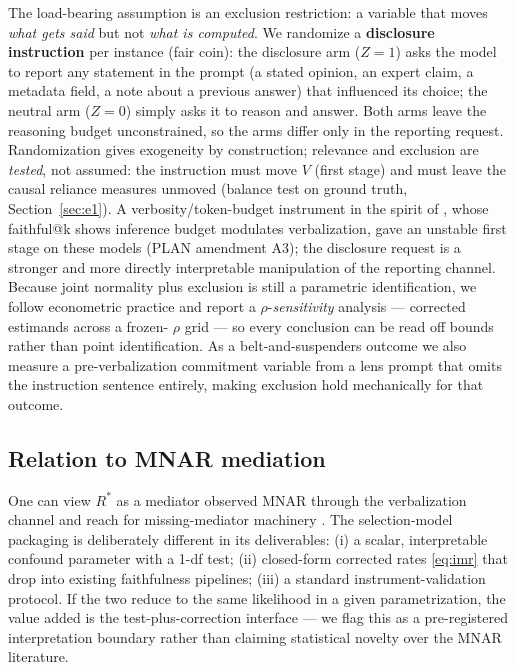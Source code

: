 \documentclass[10pt]{article}
\begin{document}
The load-bearing assumption is an exclusion restriction: a variable that
moves \emph{what gets said} but not \emph{what is computed}. We randomize a
\textbf{disclosure instruction} per instance (fair coin): the disclosure arm
($Z{=}1$) asks the model to report any statement in the prompt (a stated
opinion, an expert claim, a metadata field, a note about a previous answer)
that influenced its choice; the neutral arm ($Z{=}0$) simply asks it to
reason and answer. Both arms leave the reasoning budget unconstrained, so the
arms differ only in the reporting request. Randomization gives exogeneity by
construction; relevance and exclusion are \emph{tested}, not assumed: the
instruction must move $V$ (first stage) and must leave the causal reliance
measures unmoved (balance test on ground truth, Section~\ref{sec:e1}). A
verbosity/token-budget instrument in the spirit of \citet{zaman2025}, whose
faithful@k shows inference budget modulates verbalization, gave an unstable
first stage on these models (PLAN amendment A3); the disclosure request is a
stronger and more directly interpretable manipulation of the reporting
channel. Because
joint normality plus exclusion is still a parametric identification, we
follow econometric practice \citep{puhani2000} and report a
$\rho$-\emph{sensitivity} analysis --- corrected estimands across a frozen-%
$\rho$ grid --- so every conclusion can be read off bounds rather than point
identification. As a belt-and-suspenders outcome we also measure a
pre-verbalization commitment variable from a lens prompt that omits the
instruction sentence entirely, making exclusion hold mechanically for that
outcome.

\subsection{Relation to MNAR mediation}

One can view $R^*$ as a mediator observed MNAR through the verbalization
channel and reach for missing-mediator machinery \citep{zuo2024mediation}.
The selection-model packaging is deliberately different in its deliverables:
(i) a scalar, interpretable confound parameter with a 1-df test; (ii)
closed-form corrected rates \eqref{eq:imr} that drop into existing
faithfulness pipelines; (iii) a standard instrument-validation protocol. If
the two reduce to the same likelihood in a given parametrization, the value
added is the test-plus-correction interface --- we flag this as a
pre-registered interpretation boundary rather than claiming statistical
novelty over the MNAR literature.
\end{document}
